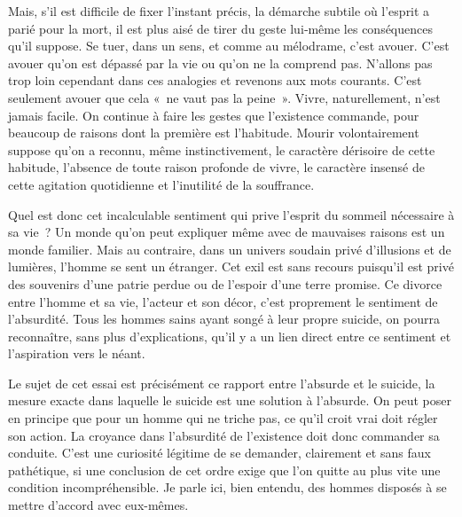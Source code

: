 \documentclass{book}
\begin{document}
Mais, s'il est difficile de fixer l'instant précis, la démarche subtile où l'esprit a parié pour la mort, il est plus aisé de tirer du geste lui‑même les conséquences qu'il suppose. Se tuer, dans un sens, et comme au mélodrame, c'est avouer. C'est avouer qu'on est dépassé par la vie ou qu'on ne la comprend pas. N'allons pas trop loin cependant dans ces analogies et revenons aux mots courants. C'est seulement avouer que cela « ne vaut pas la peine ». Vivre, naturellement, n'est jamais facile. On continue à faire les gestes que l'existence commande, pour beaucoup de raisons dont la première est l'habitude. Mourir volontairement suppose qu'on a reconnu, même instinctivement, le caractère dérisoire de cette habitude, l'absence de toute raison profonde de vivre, le caractère insensé de cette agitation quotidienne et l'inutilité de la souffrance.

Quel est donc cet incalculable sentiment qui prive l'esprit du sommeil nécessaire à sa vie ? Un monde qu'on peut expliquer même avec de mauvaises raisons est un monde familier. Mais au contraire, dans un univers soudain privé d'illusions et de lumières, l'homme se sent un étranger. Cet exil est sans recours puisqu'il est privé des souvenirs d'une patrie perdue ou de l'espoir d'une terre promise. Ce divorce entre l'homme et sa vie, l'acteur et son décor, c'est proprement le sentiment de l'absurdité. Tous les hommes sains ayant songé à leur propre suicide, on pourra reconnaître, sans plus d'explications, qu'il y a un lien direct entre ce sentiment et l'aspiration vers le néant.

Le sujet de cet essai est précisément ce rapport entre l'absurde et le suicide, la mesure exacte dans laquelle le suicide est une solution à l'absurde. On peut poser en principe que pour un homme qui ne triche pas, ce qu'il croit vrai doit régler son action. La croyance dans l'absurdité de l'existence doit donc commander sa conduite. C'est une curiosité légitime de se demander, clairement et sans faux pathétique, si une conclusion de cet ordre exige que l'on quitte au plus vite une condition incompréhensible. Je parle ici, bien entendu, des hommes disposés à se mettre d'accord avec eux-mêmes.
\end{document}

